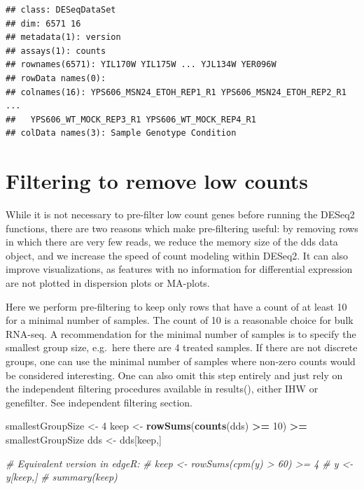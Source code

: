 \documentclass[
]{book}
\newenvironment{Shaded}{\begin{snugshade}}{\end{snugshade}}
\newcommand{\CommentTok}[1]{\textcolor[rgb]{0.56,0.35,0.01}{\textit{#1}}}
\newcommand{\DecValTok}[1]{\textcolor[rgb]{0.00,0.00,0.81}{#1}}
\newcommand{\FunctionTok}[1]{\textcolor[rgb]{0.13,0.29,0.53}{\textbf{#1}}}
\newcommand{\NormalTok}[1]{#1}
\newcommand{\OtherTok}[1]{\textcolor[rgb]{0.56,0.35,0.01}{#1}}
\newcommand{\SpecialCharTok}[1]{\textcolor[rgb]{0.81,0.36,0.00}{\textbf{#1}}}
\begin{document}
\begin{verbatim}
## class: DESeqDataSet 
## dim: 6571 16 
## metadata(1): version
## assays(1): counts
## rownames(6571): YIL170W YIL175W ... YJL134W YER096W
## rowData names(0):
## colnames(16): YPS606_MSN24_ETOH_REP1_R1 YPS606_MSN24_ETOH_REP2_R1 ...
##   YPS606_WT_MOCK_REP3_R1 YPS606_WT_MOCK_REP4_R1
## colData names(3): Sample Genotype Condition
\end{verbatim}

\begin{Shaded}
\end{Shaded}

\hypertarget{filtering-to-remove-low-counts-1}{%
\section{Filtering to remove low counts}\label{filtering-to-remove-low-counts-1}}

While it is not necessary to pre-filter low count genes before running the DESeq2 functions, there are two reasons which make pre-filtering useful: by removing rows in which there are very few reads, we reduce the memory size of the dds data object, and we increase the speed of count modeling within DESeq2. It can also improve visualizations, as features with no information for differential expression are not plotted in dispersion plots or MA-plots.

Here we perform pre-filtering to keep only rows that have a count of at least 10 for a minimal number of samples. The count of 10 is a reasonable choice for bulk RNA-seq. A recommendation for the minimal number of samples is to specify the smallest group size, e.g.~here there are 4 treated samples. If there are not discrete groups, one can use the minimal number of samples where non-zero counts would be considered interesting. One can also omit this step entirely and just rely on the independent filtering procedures available in results(), either IHW or genefilter. See independent filtering section.

\begin{Shaded}
\begin{Highlighting}[]
\NormalTok{smallestGroupSize }\OtherTok{\textless{}{-}} \DecValTok{4}
\NormalTok{keep }\OtherTok{\textless{}{-}} \FunctionTok{rowSums}\NormalTok{(}\FunctionTok{counts}\NormalTok{(dds) }\SpecialCharTok{\textgreater{}=} \DecValTok{10}\NormalTok{) }\SpecialCharTok{\textgreater{}=}\NormalTok{ smallestGroupSize}
\NormalTok{dds }\OtherTok{\textless{}{-}}\NormalTok{ dds[keep,]}

\CommentTok{\# Equivalent version in edgeR:}
\CommentTok{\# keep \textless{}{-} rowSums(cpm(y) \textgreater{} 60) \textgreater{}= 4}
\CommentTok{\# y \textless{}{-} y[keep,]}
\CommentTok{\# summary(keep)}
\end{Highlighting}
\end{Shaded}
\end{document}
